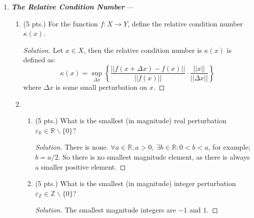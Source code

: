 \documentclass[12pt]{article}
\newcommand{\gnorm}[1]{\left|\left|#1\right|\right|}
\newcommand{\parens}[1]{\left(#1\right)}
\newcommand{\bracks}[1]{\left\{#1\right\}}
\newcommand{\bfit}[1]{\textbf{\textit{#1}}}
\begin{document}
\begin{enumerate}

   \item \bfit{The Relative Condition Number} ---

   \begin{enumerate}

   \item (5 pts.) For the function $f:X\rightarrow Y$, define the
     relative condition number $\kappa(x)$.
     \begin{proof}[Solution]
     Let $x \in X$, then the relative condition number is $\kappa(x)$ is defined as:
     $$\kappa(x) = \sup_{\Delta x}\bracks{\frac{\gnorm{f\parens{x + \Delta x} - f(x)}}{\gnorm{f(x)}}\cdot\frac{\gnorm{x}}{\gnorm{\Delta x}}}$$
     where $\Delta x$ is some small perturbation on $x$.
     \end{proof}

     
   \item
     \begin{enumerate}

     \item (5 pts.) What is the smallest (in magnitude) real perturbation
       $\varepsilon_{\mathbb{R}} \in \mathbb{R} \backslash
       \{0\}$?
       \begin{proof}[Solution]
       There is none. $\forall a \in \mathbb{R}, a > 0,\ \exists b \in \mathbb{R}: 0 < b < a$, for example; $b = a/2$. So there is no smallest magnitude element, as there is always a smaller positive element.
       \end{proof}
        


     \item (5 pts.) What is the smallest (in magnitude) integer perturbation
       $\varepsilon_{\mathbb{Z}} \in \mathbb{Z} \backslash \{0\}$?
       \begin{proof}[Solution]
       The smallest magnitude integers are $-1$ and $1$.
       \end{proof}



\end{enumerate}
\end{enumerate}
\end{enumerate}
\end{document}
